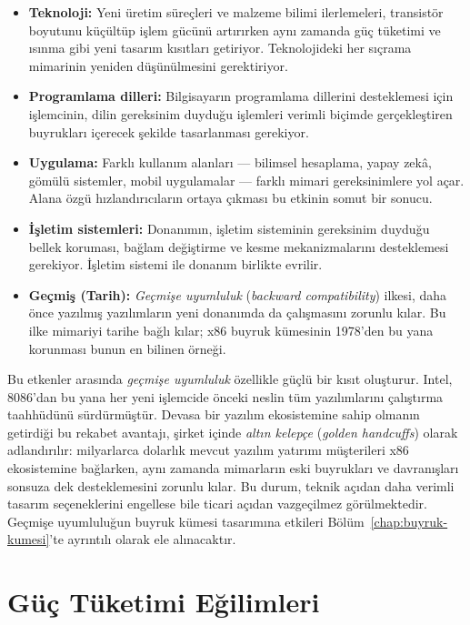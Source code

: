 \begin{itemize}
    \item \textbf{Teknoloji:} Yeni üretim süreçleri ve malzeme bilimi ilerlemeleri, transistör boyutunu küçültüp işlem gücünü artırırken aynı zamanda güç tüketimi ve ısınma gibi yeni tasarım kısıtları getiriyor. Teknolojideki her sıçrama mimarinin yeniden düşünülmesini gerektiriyor.
    \item \textbf{Programlama dilleri:} Bilgisayarın programlama dillerini desteklemesi için işlemcinin, dilin gereksinim duyduğu işlemleri verimli biçimde gerçekleştiren buyrukları içerecek şekilde tasarlanması gerekiyor.
    \item \textbf{Uygulama:} Farklı kullanım alanları --- bilimsel hesaplama, yapay zekâ, gömülü sistemler, mobil uygulamalar --- farklı mimari gereksinimlere yol açar. Alana özgü hızlandırıcıların ortaya çıkması bu etkinin somut bir sonucu.
    \item \textbf{İşletim sistemleri:} Donanımın, işletim sisteminin gereksinim duyduğu bellek koruması, bağlam değiştirme ve kesme mekanizmalarını desteklemesi gerekiyor. İşletim sistemi ile donanım birlikte evrilir.
    \item \textbf{Geçmiş (Tarih):} \emph{Geçmişe uyumluluk} (\emph{backward compatibility}) ilkesi, daha önce yazılmış yazılımların yeni donanımda da çalışmasını zorunlu kılar. Bu ilke mimariyi tarihe bağlı kılar; x86 buyruk kümesinin 1978'den bu yana korunması bunun en bilinen örneği.
\end{itemize}

Bu etkenler arasında \emph{geçmişe uyumluluk} özellikle güçlü bir kısıt oluşturur. Intel, 8086'dan bu yana her yeni işlemcide önceki neslin tüm yazılımlarını çalıştırma taahhüdünü sürdürmüştür. Devasa bir yazılım ekosistemine sahip olmanın getirdiği bu rekabet avantajı, şirket içinde \emph{altın kelepçe} (\emph{golden handcuffs}) olarak adlandırılır: milyarlarca dolarlık mevcut yazılım yatırımı müşterileri x86 ekosistemine bağlarken, aynı zamanda mimarların eski buyrukları ve davranışları sonsuza dek desteklemesini zorunlu kılar. Bu durum, teknik açıdan daha verimli tasarım seçeneklerini engellese bile ticari açıdan vazgeçilmez görülmektedir. Geçmişe uyumluluğun buyruk kümesi tasarımına etkileri Bölüm~\ref{chap:buyruk-kumesi}'te ayrıntılı olarak ele alınacaktır.

\section{Güç Tüketimi Eğilimleri}
\label{sec:guc-tuketimi}

